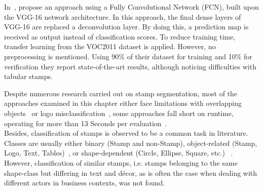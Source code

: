 \begin{description}
\begin{enumerate*}[label={\alph*)},font={\color{red!50!black}\bfseries}]
        In~\cite{Younas.09.11.201715.11.2017},
        \citeauthor*{Younas.09.11.201715.11.2017} propose an approach using a
        Fully Convolutional Network (FCN), built upon the VGG-16 network
        architecture. In this approach, the final dense layers of VGG-16 are
        replaced a deconvolution layer. By doing this, a prediction map is
        received as output instead of classification scores. To reduce training
        time, transfer learning from the VOC2011 dataset is applied. However,
        no preprocessing is mentioned. Using 90\% of their dataset for training
        and 10\% for verification they report state-of-the-art results,
        although noticing difficulties with tabular stamps.
    \end{enumerate*}
\end{description}

Despite numerous research carried out on stamp segmentation, most of the 
approaches examined in this chapter either face limitations with overlapping 
objects~\cite{Nandedkar.23.08.201526.08.2015, Nandedkar.16.12.201519.12.2015, 
Forczmanski.2016, Ahmed.25.08.201328.08.2013, Dey.16.12.201519.12.2015, 
Forczmanski.2015, Forczmanski.2016} or logo misclassification~\cite
{Ahmed.25.08.201328.08.2013, Dey.16.12.201519.12.2015, 
Micenkova.18.09.201121.09.2011}, some approaches fall short
on runtime, operating for more than 13 Seconds per evaluation~\cite{Ahmed.2016, 
Nandedkar.23.08.201526.08.2015}.\\
Besides, classification of stamps is observed to be a common task in 
literature. Classes are usually either binary (Stamp and non-Stamp), 
object-related (Stamp, Logo, Text, Tables)~\cite{Forczmanski.2016,
Nandedkar.23.08.201526.08.2015, Nandedkar.16.12.201519.12.2015, 
Dey.16.12.201519.12.2015}, or shape-dependent (Circle, Ellipse, Square, etc.)
~\cite{Forczmanski.2015}. However, classification of similar stamps, i.e. 
stamps belonging to the same shape-class but differing in text and décor, as is 
often the case when dealing with different actors in business contexts, was not 
found.

